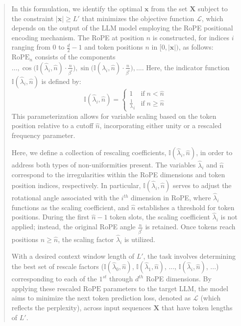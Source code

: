 \begin{abstract}
In this formulation, we identify the optimal $\mathbf{x}$ from the set $\mathbf{X}$ subject to the constraint $|\mathbf{x}| \ge L'$ that minimizes the objective function $\mathcal{L}$, which depends on the output of the LLM model employing the RoPE positional encoding mechanism. The RoPE at position $n$ is constructed, for indices $i$ ranging from $0$ to $\frac{d}{2}-1$ and token positions $n$ in $[0, |\mathbf{x}|)$, as follows:
\\
$\text{RoPE}_n$ consists of the components $\ldots, \cos\big(\mathbb{I}(\hat{\lambda}_{i}, \hat{n})\cdot \frac{n}{\beta^i}\big), \sin\big(\mathbb{I}(\hat{\lambda}_{i}, \hat{n})\cdot \frac{n}{\beta^i}\big), \ldots$. Here, the indicator function $\mathbb{I}(\hat{\lambda}_{i}, \hat{n})$ is defined by:
\[
\mathbb{I}(\hat{\lambda}_{i},\hat{n}) =
\begin{cases}
1 &\text{if}\; n<\hat{n}\\
{\frac{1}{\lambda}_{i}} &\text{if}\; n\geq\hat{n}
\end{cases}
\]
This parameterization allows for variable scaling based on the token position relative to a cutoff $\hat{n}$, incorporating either unity or a rescaled frequency parameter.

Here, we define a collection of rescaling coefficients, $\mathbb{I}(\hat{\lambda}_{i},\hat{n})$, in order to address both types of non-uniformities present. The variables $\hat{\lambda}_i$ and $\hat{n}$ correspond to the irregularities within the RoPE dimensions and token position indices, respectively. In particular, $\mathbb{I}(\hat{\lambda}_{i},\hat{n})$ serves to adjust the rotational angle associated with the $i^{th}$ dimension in RoPE, where $\hat\lambda_{i}$ functions as the scaling coefficient, and $\hat{n}$ establishes a threshold for token positions. During the first $\hat{n}-1$ token slots, the scaling coefficient $\hat\lambda_{i}$ is not applied; instead, the original RoPE angle $\frac{n}{\beta^i}$ is retained. Once tokens reach positions $n \geq \hat{n}$, the scaling factor $\hat\lambda_{i}$ is utilized.

With a desired context window length of $L'$, the task involves determining the best set of rescale factors ($\mathbb{I}(\hat{\lambda}_{0},\hat{n})$, $\mathbb{I}(\hat{\lambda}_{1},\hat{n})$, ..., $\mathbb{I}(\hat{\lambda}_{i},\hat{n})$, ...) corresponding to each of the $1^{st}$ through $d^{th}$ RoPE dimensions. By applying these rescaled $\text{RoPE}$ parameters to the target $\text{LLM}$, the model aims to minimize the next token prediction loss, denoted as $\mathcal{L}$ (which reflects the perplexity), across input sequences $\mathbf{X}$ that have token lengths of $L'$.


\end{abstract}

